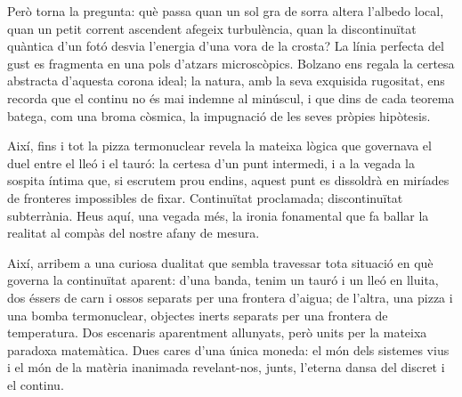 Però torna la pregunta: què passa quan un sol gra de sorra altera
l’albedo local, quan un petit corrent ascendent afegeix turbulència,
quan la discontinuïtat quàntica d’un fotó desvia l’energia d’una vora
de la crosta?  La línia perfecta del gust es fragmenta en una pols
d’atzars microscòpics.  Bolzano ens regala la certesa abstracta
d’aquesta corona ideal; la natura, amb la seva exquisida rugositat,
ens recorda que el continu no és mai indemne al minúscul, i que
dins de cada teorema batega, com una broma còsmica, la impugnació
de les seves pròpies hipòtesis.

Així, fins i tot la pizza termonuclear revela la mateixa lògica que
governava el duel entre el lleó i el tauró: la certesa d’un punt
intermedi, i a la vegada la sospita íntima que, si escrutem prou
endins, aquest punt es dissoldrà en miríades de fronteres
impossibles de fixar.  Continuïtat proclamada; discontinuïtat
subterrània.  Heus aquí, una vegada més, la ironia fonamental que
fa ballar la realitat al compàs del nostre afany de mesura.

\par\bigskip
Així, arribem a una curiosa dualitat que sembla travessar tota situació en què governa la continuïtat aparent: d'una banda, tenim un tauró i un lleó en lluita, dos éssers de carn i ossos separats per una frontera d'aigua; de l'altra, una pizza i una bomba termonuclear, objectes inerts separats per una frontera de temperatura. Dos escenaris aparentment allunyats, però units per la mateixa paradoxa matemàtica. Dues cares d'una única moneda: el món dels sistemes vius i el món de la matèria inanimada revelant-nos, junts, l'eterna dansa del discret i el continu.